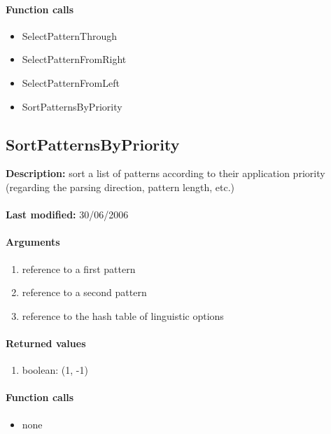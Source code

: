 \paragraph{Function calls}
\begin{itemize}
\item SelectPatternThrough
\item SelectPatternFromRight
\item SelectPatternFromLeft
\item SortPatternsByPriority
\end{itemize}

\subsection{SortPatternsByPriority}
\textbf{Description:} sort a list of patterns according to their application priority (regarding the parsing direction, pattern length, etc.)\\
\\\textbf{Last modified:} 30/06/2006

\paragraph{Arguments}
\begin{enumerate}
\item reference to a first pattern
\item reference to a second pattern
\item reference to the hash table of linguistic options
\end{enumerate}

\paragraph{Returned values}
\begin{enumerate}
\item boolean: (1, -1)
\end{enumerate}

\paragraph{Function calls}
\begin{itemize}
\item none
\end{itemize}

